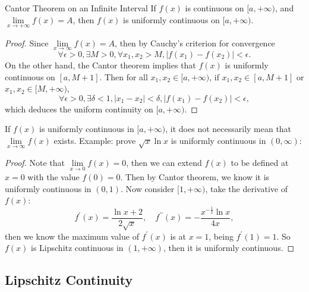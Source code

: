 \begin{theorem}{Cantor Theorem on an Infinite Interval}{}
  If $f(x)$ is continuous on $[a, +\infty)$,
  and $\lim \limits _{x \rightarrow +\infty} f(x) = A$,
  then $f(x)$ is uniformly continuous on $[a, +\infty)$.
\end{theorem}

\begin{proof}
  Since $\lim \limits _{x \rightarrow \infty} f(x) = A$,
  then by Cauchy's criterion for convergence
  \begin{equation}
    \forall \epsilon > 0, \exists M > 0,
    \forall x_1, x_2 > M, |f(x_1) - f(x_2)| < \epsilon.
  \end{equation}
  On the other hand, the Cantor theorem implies that
  $f(x)$ is uniformly continuous on $[a, M+1]$.
  Then for all $x_1, x_2 \in [a, +\infty)$,
  if $x_1, x_2 \in [a, M+1]$ or $x_1, x_2 \in [M, +\infty)$,
  \begin{equation}
    \forall \epsilon > 0, \exists \delta < 1,
    |x_1 - x_2| < \delta,
    |f(x_1) - f(x_2)| < \epsilon,
  \end{equation}
  which deduces the uniform continuity on $[a, +\infty)$.
\end{proof}

\begin{note}
  If $f(x)$ is uniformly continuous in $[a, +\infty)$, it does not necessarily mean
  that $\lim \limits _{x \rightarrow \infty}f(x)$ exists.
  Example: prove $\sqrt{x} \ln x$ is uniformly continuous in $(0, \infty)$:
\end{note}

\begin{proof}
  Note that $\lim \limits _{x \rightarrow 0}f(x) = 0$, then we can extend $f(x)$
  to be defined at $x = 0$ with the value $f(0) = 0$.
  Then by Cantor theorem, we know it is uniformly continuous in $(0, 1)$.
  Now consider $[1, +\infty)$, take the derivative of $f(x)$:
  \begin{equation}
    f^{\prime}(x) = \frac{\ln x + 2}{2 \sqrt{x}}, \quad
    f^{\prime\prime}(x) = - \frac{x^{-\frac{1}{2}} \ln x}{4x},
  \end{equation}
  then we know the maximum value of $f^{\prime}(x)$ is at $x = 1$, being
  $f^{\prime}(1) = 1$. So $f(x)$ is Lipschitz continuous in $(1, +\infty)$,
  then it is uniformly continuous.
\end{proof}

\subsection{Lipschitz Continuity}

